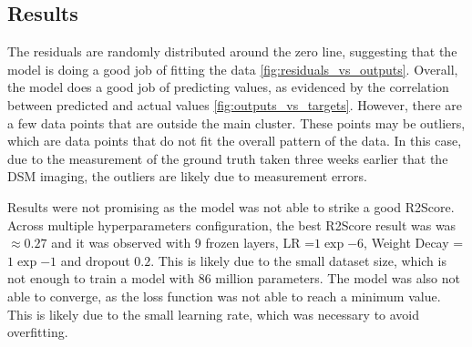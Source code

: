 \subsection{Results}
\label{sec:results}

The residuals are randomly distributed around the zero line, suggesting that the model is doing a good job of fitting the data \ref{fig:residuals_vs_outputs}. 
Overall, the model does a good job of predicting values, as evidenced by the correlation between predicted and actual values \ref{fig:outputs_vs_targets}. 
However, there are a few data points that are outside the main cluster. These points may be outliers, which are data points that do not fit the overall pattern of the data.
In this case, due to the measurement of the ground truth taken three weeks earlier that the DSM imaging, the outliers are likely due to measurement errors. 

Results were not promising as the model was not able to strike a good R2Score. Across multiple hyperparameters configuration, the best R2Score result was was $\approx  0.27$ and it was observed with 9 frozen layers, LR =$1\exp{-6}$, Weight Decay = $1\exp{-1}$ and dropout $0.2$. This is likely due to the small dataset size, which is not enough to train a model with 86 million parameters. The model was also not able to converge, as the loss function was not able to reach a minimum value. This is likely due to the small learning rate, which was necessary to avoid overfitting.
